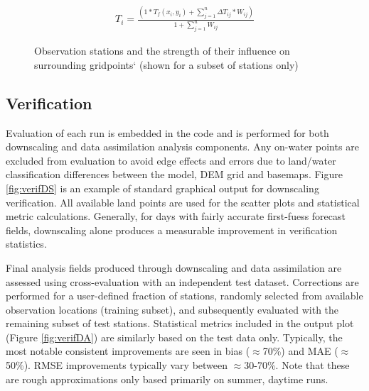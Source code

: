 \documentclass{article}
\begin{document}
\begin{eqnarray}
T_i = \frac{(1 * T_f(x_i,y_i) + \sum\limits_{j=1}^n \Delta T_{ij} * W_{ij})}{1 + \sum\limits_{j=1}^n W_{ij}}
\end{eqnarray}

\begin{landscape}
\pagestyle{empty}

\begin{figure}
\caption{Observation stations and the strength of their influence on surrounding gridpoints` (shown for a subset of stations only)}\label{fig:MD} 
\end{figure}

\end{landscape}
\restoregeometry
\pagestyle{plain}


\FloatBarrier

\subsection{Verification}
Evaluation of each run is embedded in the code and is performed for both downscaling and data assimilation analysis components. Any on-water points are excluded from evaluation to avoid edge effects and errors due to land/water classification differences between the model, DEM grid and basemaps. Figure \ref{fig:verifDS} is an example of standard graphical output for downscaling verification. All available land points are used for the scatter plots and statistical metric calculations. Generally, for days with fairly accurate first-fuess forecast fields, downscaling alone produces a measurable improvement in verification statistics. 

Final analysis fields produced through downscaling and data assimilation are assessed using cross-evaluation with an independent test dataset. Corrections are performed for a user-defined fraction of stations, randomly selected from available observation locations (training subset), and subsequently evaluated with the remaining subset of test stations. Statistical metrics included in the output plot (Figure \ref{fig:verifDA}) are similarly based on the test data only. Typically, the most notable consistent improvements are seen in bias ($\approx$70\%) and MAE ($\approx$50\%). RMSE improvements typically vary between $\approx$30-70\%. Note that these are rough approximations only based primarily on summer, daytime runs. 
\end{document}
